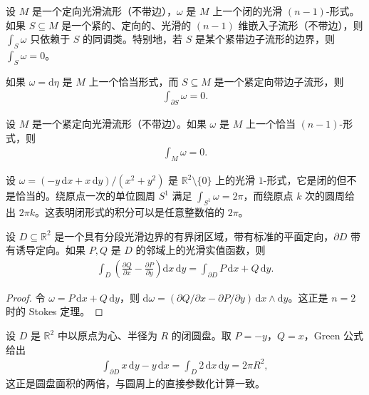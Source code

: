 \documentclass[../../main.tex]{subfiles}
\begin{document}
\begin{corollary}\label{corollary:ch16-closed-form-cycle}
设 $M$ 是一个定向光滑流形（不带边），$\omega$ 是 $M$ 上一个闭的光滑 $(n-1)$-形式。如果 $S\subseteq M$ 是一个紧的、定向的、光滑的 $(n-1)$ 维嵌入子流形（不带边），则 $\int_S\omega$ 只依赖于 $S$ 的同调类。特别地，若 $S$ 是某个紧带边子流形的边界，则 $\int_S\omega=0$。
\end{corollary}

\begin{corollary}\label{corollary:ch16-exact-form-boundary}
如果 $\omega=\mathrm{d}\eta$ 是 $M$ 上一个恰当形式，而 $S\subseteq M$ 是一个紧定向带边子流形，则
\begin{align*}
\int_{\partial S}\omega=0.
\end{align*}
\end{corollary}

\begin{corollary}\label{corollary:ch16-stokes-zero}
设 $M$ 是一个紧定向光滑流形（不带边）。如果 $\omega$ 是 $M$ 上一个恰当 $(n-1)$-形式，则
\begin{align*}
\int_M\omega=0.
\end{align*}
\end{corollary}

\begin{example}\label{example:ch16-circle-around-origin}
设 $\omega=(-y\,\mathrm{d}x+x\,\mathrm{d}y)/(x^2+y^2)$ 是 $\mathbb{R}^2\setminus\{0\}$ 上的光滑 $1$-形式，它是闭的但不是恰当的。绕原点一次的单位圆周 $S^1$ 满足 $\int_{S^1}\omega=2\pi$，而绕原点 $k$ 次的圆周给出 $2\pi k$。这表明闭形式的积分可以是任意整数倍的 $2\pi$。
\end{example}

\begin{theorem}[Green 公式]\label{theorem:ch16-greens-theorem}
设 $D\subseteq\mathbb{R}^2$ 是一个具有分段光滑边界的有界闭区域，带有标准的平面定向，$\partial D$ 带有诱导定向。如果 $P,Q$ 是 $D$ 的邻域上的光滑实值函数，则
\begin{align}
\int_D\left(\frac{\partial Q}{\partial x}-\frac{\partial P}{\partial y}\right)\mathrm{d}x\,\mathrm{d}y=\int_{\partial D}P\,\mathrm{d}x+Q\,\mathrm{d}y.
\end{align}
\end{theorem}

\begin{proof}令 $\omega=P\,\mathrm{d}x+Q\,\mathrm{d}y$，则 $\mathrm{d}\omega=(\partial Q/\partial x-\partial P/\partial y)\,\mathrm{d}x\wedge\mathrm{d}y$。这正是 $n=2$ 时的 Stokes 定理。
\end{proof}

\begin{example}\label{example:ch16-flux-through-circle}
设 $D$ 是 $\mathbb{R}^2$ 中以原点为心、半径为 $R$ 的闭圆盘。取 $P=-y$，$Q=x$，Green 公式给出
\begin{align*}
\int_{\partial D}x\,\mathrm{d}y-y\,\mathrm{d}x=\int_D 2\,\mathrm{d}x\,\mathrm{d}y=2\pi R^2,
\end{align*}
这正是圆盘面积的两倍，与圆周上的直接参数化计算一致。
\end{example}
\end{document}
